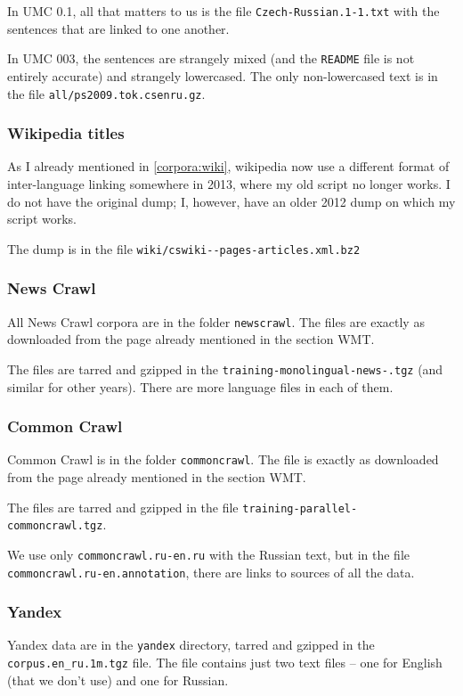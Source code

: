 In UMC 0.1, all that matters to us is the file \texttt{Czech-Russian.1-1.txt} with the sentences that are linked to one another.

In UMC 003, the sentences are strangely mixed (and the \texttt{README} file is not entirely accurate) and strangely lowercased. The only non-lowercased text is in the file \texttt{all/ps2009.tok.csenru.gz}.

\subsubsection{Wikipedia titles}
As I already mentioned in \ref{corpora:wiki}, wikipedia now use a different format of inter-language linking somewhere in 2013, where my old script no longer works. I do not have the original dump; I, however, have an older 2012 dump on which my script works.

The dump is in the file \texttt{wiki/cswiki--\allowbreak pages-\allowbreak articles.xml.bz2}

\subsubsection{News Crawl}
All News Crawl corpora are in the folder \texttt{newscrawl}. The files are exactly as downloaded from the page already mentioned in the section WMT.

The files are tarred and gzipped in the \texttt{training-\allowbreak monolingual-\allowbreak news-.\allowbreak tgz} (and similar for other years). There are more language files in each of them.

\subsubsection{Common Crawl}
Common Crawl is in the folder \texttt{commoncrawl}. The file is exactly as downloaded from the page already mentioned in the section WMT.

The files are tarred and gzipped in the file \texttt{training-\allowbreak parallel-\allowbreak commoncrawl.tgz}. 

We use only \texttt{commoncrawl.\allowbreak ru-\allowbreak en.\allowbreak ru}
with the Russian text, but in the file \texttt{commoncrawl.\allowbreak ru-\allowbreak en.\allowbreak annotation}, there are links to sources of all the data.
\subsubsection{Yandex}
Yandex data are in the \texttt{yandex} directory, tarred and gzipped in the \texttt{corpus.\allowbreak en\_ru.\allowbreak 1m.\allowbreak tgz} file. The file contains just two text files -- one for English (that we don't use) and one for Russian.


